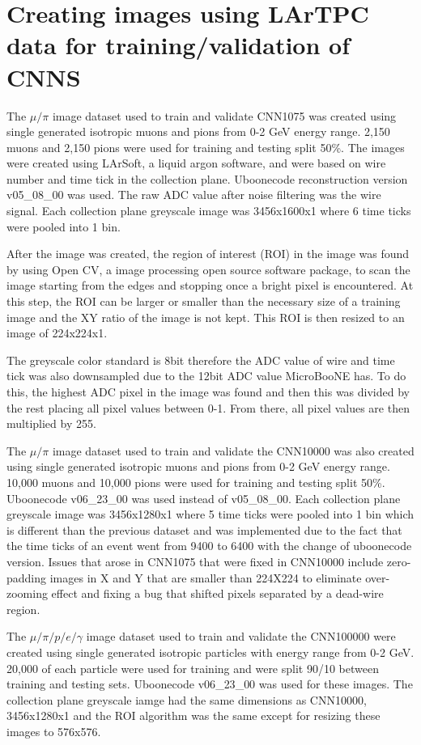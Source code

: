 \section{Creating images using LArTPC data for training/validation of CNNS}\label{image_making}
The $\mu/\pi$ image dataset used to train and validate CNN1075 was created using single generated isotropic muons and pions from 0-2 GeV energy range. 2,150 muons and 2,150 pions were used for training and testing split 50\%. The images were created using LArSoft, a liquid argon software, and were based on wire number and time tick in the collection plane. Uboonecode reconstruction version v05{\_}08{\_}00 was used. The raw ADC value after noise filtering was the wire signal. Each collection plane greyscale image was 3456x1600x1 where 6 time ticks were pooled into 1 bin. 

After the image was created, the region of interest (ROI) in the image was found by using Open CV, a image processing open source software package, to scan the image starting from the edges and stopping once a bright pixel is encountered. At this step, the ROI can be larger or smaller than the necessary size of a training image and the XY ratio of the image is not kept. This ROI is then resized to an image of 224x224x1. 

The greyscale color standard is 8bit therefore the ADC value of wire and time tick was also downsampled due to the 12bit ADC value MicroBooNE has. To do this, the highest ADC pixel in the image was found and then this was divided by the rest placing all pixel values between 0-1. From there, all pixel values are then multiplied by 255.

The $\mu/\pi$ image dataset used to train and validate the CNN10000 was also created using single generated isotropic muons and pions from 0-2 GeV energy range. 10,000 muons and 10,000 pions were used for training and testing split 50\%. Uboonecode v06{\_}23{\_}00 was used instead of v05{\_}08{\_}00. Each collection plane greyscale image was 3456x1280x1 where 5 time ticks were pooled into 1 bin which is different than the previous dataset and was implemented due to the fact that the time ticks of an event went from 9400 to 6400 with the change of uboonecode version. Issues that arose in CNN1075 that were fixed in CNN10000 include zero-padding images in X and Y that are smaller than 224X224 to eliminate over-zooming effect and fixing a bug that shifted pixels separated by a dead-wire region.

The $\mu/\pi/p/e/\gamma$ image dataset used to train and validate the CNN100000 were created using single generated isotropic particles with energy range from 0-2 GeV. 20,000 of each particle were used for training and were split 90/10 between training and testing sets. Uboonecode v06{\_}23{\_}00 was used for these images. The collection plane greyscale iamge had the same dimensions as CNN10000, 3456x1280x1 and the ROI algorithm was the same except for resizing these images to 576x576. 

